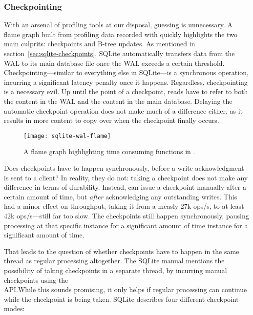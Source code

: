 \subsubsection{Checkpointing}

With an arsenal of profiling tools at our disposal, guessing is unnecessary. A
flame graph built from profiling data recorded with  quickly
highlights the two main culprits: checkpoints and B-tree updates. As mentioned
in section~\ref{sec:sqlite-checkpoints}, SQLite automatically transfers data
from the WAL to its main database file once the WAL exceeds a certain threshold.
Checkpointing---similar to everything else in SQLite---is a synchronous
operation, incurring a significant latency penalty once it happens. Regardless,
checkpointing is a necessary evil. Up until the point of a checkpoint, reads
have to refer to both the content in the WAL and the content in the main
database. Delaying the automatic checkpoint operation does not make much of a
difference either, as it results in more content to copy over when the
checkpoint finally occurs.

\begin{figure}[H]
  \centering
  \texttt{[image: sqlite-wal-flame]}
  \caption{A flame graph highlighting time consuming functions in
  .}\label{fig:sqlite-wal}
\end{figure}

Does checkpoints have to happen synchronously, before a write acknowledgment is
sent to a client? In reality, they do not: taking a checkpoint does not make any
difference in terms of durability. Instead,  can issue a
checkpoint manually after a certain amount of time, but \textit{after}
acknowledging any outstanding writes. This had a minor effect on throughput,
taking it from a measly 27k ops/s, to at least 42k ops/s---still far too slow.
The checkpoints still happen synchronously, pausing processing at that specific
 instance for a significant amount of time instance for a
significant amount of time.

That leads to the question of whether checkpoints have to happen in the same
thread as regular processing altogether. The SQLite manual mentions the
possibility of taking checkpoints in a separate thread, by incurring manual
checkpoints using the \\  API.\@ While this
sounds promising, it only helps if regular processing can continue while the
checkpoint is being taken. SQLite describes four different checkpoint
modes:

